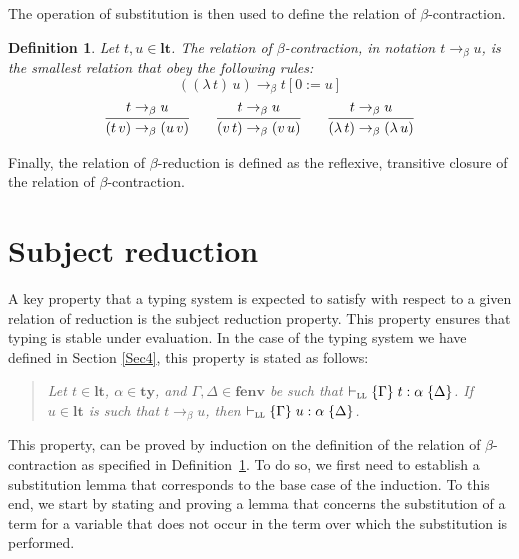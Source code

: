 \documentclass[submission,creativecommons]{eptcs}
\newtheorem{definition}{Definition}
\newcommand{\iabs}[1]{(\lambda\,#1)}
\newcommand{\iapp}[2]{(#1\,#2)}
\newcommand{\sbstt}[3]{#1[#2 := #3]}
\newcommand{\tytm}[4]{\{#1\}\;#2:#3\;\{#4\}}
\newcommand{\der}[1]{\vdash_{#1}}
\newcommand{\Sll}{{\textsc{ll}}}
\newcommand{\ltm}{\mathord{\mathbf{lt}}}
\newcommand{\ty}{\mathord{\mathbf{ty}}}
\newcommand{\fenv}{\mathord{\mathbf{fenv}}}
\begin{document}
The operation of substitution is then used to define the relation of $\beta$-contraction.

\begin{definition} \label{def:beta}
Let $t, u \in \ltm$. The relation of $\beta$-contraction, in notation $t \rightarrow_\beta u$, is the smallest relation that obey
the following rules:
$$
\iapp{\iabs{t}}{u} \rightarrow_{\beta} \sbstt{t}{0}{u}
$$
$$
\infer{
\iapp{t}{v} \rightarrow_{\beta} \iapp{u}{v}
}{
t \rightarrow_{\beta} u
}
\quad\quad
\infer{
\iapp{v}{t} \rightarrow_{\beta} \iapp{v}{u}
}{
t \rightarrow_{\beta} u
}
\quad\quad
\infer{
\iabs{t} \rightarrow_{\beta} \iabs{u}
}{
t \rightarrow_{\beta} u
}
$$
\end{definition}

Finally, the relation of $\beta$-reduction is defined as the reflexive, transitive closure of the relation of $\beta$-contraction.

\section{Subject reduction}

A key property that a typing system is expected to satisfy with respect to a given relation of reduction is the subject
reduction property. This property ensures that typing is stable under evaluation. In the case of the typing system we
have defined in Section \ref{Sec4}, this property is stated as follows:
\begin{quote}
\textit{Let $t\in \ltm$, $\alpha \in \ty$, and $\Gamma, \Delta \in \fenv$ be such that
$\der{\Sll}\tytm{\Gamma}{t}{\alpha}{\Delta}$. If $u\in \ltm$ is such that
$t\rightarrow_\beta u$, then $\der{\Sll}\tytm{\Gamma}{u}{\alpha}{\Delta}$.}
\end{quote}

\noindent
This property, can be proved by induction on the definition of the relation of $\beta$-contraction as specified in
Definition~\ref{def:beta}. To do so, we first need to establish a substitution lemma that corresponds to the base
case of the induction.
To this end, we start by stating and proving a lemma that concerns the substitution of a term for a variable
that does not occur in the term over which the substitution is performed.
\end{document}
